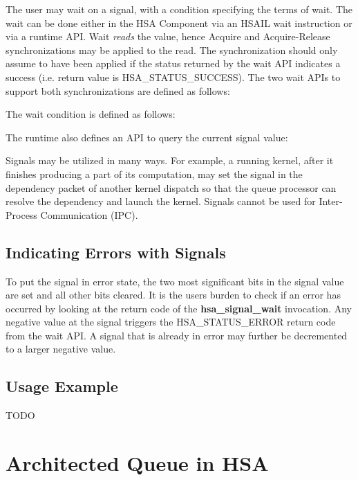 \documentclass{book}
\newcommand{\reffun}[1]{\textbf{#1}}
\newcommand{\reftyp}[1]{#1}
\newcommand{\refenu}[1]{\reftyp{#1}}
\begin{document}


The user may wait on a signal, with a condition specifying the terms
of wait. The wait can be done either in the HSA Component via an HSAIL
wait instruction or via a runtime API. Wait \emph{reads} the value,
hence Acquire and Acquire-Release synchronizations may be applied to
the read. The synchronization should only assume to have been applied
if the status returned by the wait API indicates a success
(i.e. return value is \refenu{HSA\_STATUS\_SUCCESS}). The two wait APIs
to support both synchronizations are defined as follows:



The wait condition is defined as follows:



The runtime also defines an API to query the current signal value:



Signals may be utilized in many ways. For example, a running kernel,
after it finishes producing a part of its computation, may set the
signal in the dependency packet of another kernel dispatch so that the
queue processor can resolve the dependency and launch the
kernel. Signals cannot be used for Inter-Process Communication (IPC).

\hypertarget{signal_error}{} \subsection{ Indicating Errors with
  Signals} \label{signal_error} To put the signal in error state, the
two most significant bits in the signal value are set and all other
bits cleared. It is the users burden to check if an error has occurred
by looking at the return code of the \reffun{hsa\_signal\_wait}
invocation. Any negative value at the signal triggers the
\refenu{HSA\_STATUS\_ERROR} return code from the wait API. A signal
that is already in error may further be decremented to a larger
negative value.

\hypertarget{signal_example}{} \subsection{Usage Example}
TODO

\hypertarget{architected\_queue}{} \section{Architected Queue in
HSA} \label{architected_queue}
\end{document}
